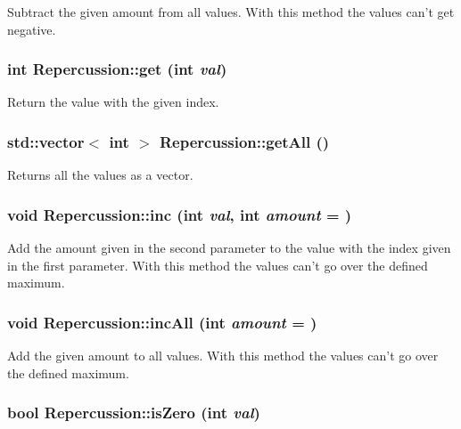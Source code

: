 Subtract the given amount from all values. With this method the values can't get negative. \hypertarget{classRepercussion_a1841959db6918b0bacdd436ef56b8313}{
\subsubsection[{get}]{\setlength{\rightskip}{0pt plus 5cm}int Repercussion::get (int {\em val})}}
\label{classRepercussion_a1841959db6918b0bacdd436ef56b8313}
Return the value with the given index. \hypertarget{classRepercussion_af2d97e8c5795fb6df793e0f17dd4831d}{
\subsubsection[{getAll}]{\setlength{\rightskip}{0pt plus 5cm}std::vector$<$ int $>$ Repercussion::getAll ()}}
\label{classRepercussion_af2d97e8c5795fb6df793e0f17dd4831d}
Returns all the values as a vector. \hypertarget{classRepercussion_aaa27e3c9251d0dda1c24ac77421bdaab}{
\subsubsection[{inc}]{\setlength{\rightskip}{0pt plus 5cm}void Repercussion::inc (int {\em val}, \/  int {\em amount} = {})}}
\label{classRepercussion_aaa27e3c9251d0dda1c24ac77421bdaab}
Add the amount given in the second parameter to the value with the index given in the first parameter. With this method the values can't go over the defined maximum. \hypertarget{classRepercussion_afece2a141e05cceea3dff10b7d67c63e}{
\subsubsection[{incAll}]{\setlength{\rightskip}{0pt plus 5cm}void Repercussion::incAll (int {\em amount} = {})}}
\label{classRepercussion_afece2a141e05cceea3dff10b7d67c63e}
Add the given amount to all values. With this method the values can't go over the defined maximum. \hypertarget{classRepercussion_a95fc77c0adf534f0ce92a48a23bdaece}{
\subsubsection[{isZero}]{\setlength{\rightskip}{0pt plus 5cm}bool Repercussion::isZero (int {\em val})}}
